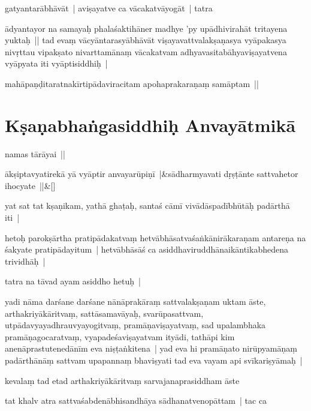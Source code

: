 \documentclass[article,a4paper]{memoir}
\begin{document}
	  \pstart gatyantarā\-bhā\-vā\-t | aviṣayatve ca vā\-cakatvā\-yogā\-t | tatra
	\pend
      

	  \pstart ā\-dyantayor na samayaḥ phalaśaktihā\-ner madhye 'py upā\-dhivirahā\-t tritayena yuktaḥ || \label{thakur75-66.19} tad evaṃ vā\-cyā\-ntarasyā\-bhā\-vā\-t viṣayavattvalakṣaṇasya vyā\-pakasya nivṛttau vipakṣato nivarttamā\-naṃ vā\-cakatvam adhyavasitabā\-hyaviṣayatvena vyā\-pyata iti vyā\-ptisiddhiḥ |
	\pend
      

	  \pstart mahā\-paṇḍitaratnakī\-rtipā\-daviracitam apohaprakaraṇaṃ samā\-ptam || 
	\pend
      
	  
	
\section[{Kṣaṇabhaṅgasiddhiḥ Anvayā\-tmikā\-}]{Kṣaṇabhaṅgasiddhiḥ Anvayā\-tmikā\-}\label{Kṣaṇabhaṅgasiddhiḥ_Anvayātmikā}

	  \pstart namas tā\-rā\-yai ||
	\pend
      
	    
	    \stanza[\smallbreak]
ā\-kṣiptavyatirekā\- yā\- vyā\-ptir anvayarū\-piṇī\- |&sā\-dharmyavati dṛṣṭā\-nte sattvahetor ihocyate ||\&[\smallbreak]


	

	  \pstart yat sat tat kṣaṇikam, yathā\- ghaṭaḥ, santaś cā\-mī\- vivā\-dā\-spadī\-bhū\-tā\-ḥ padā\-rthā\- iti |
	\pend
      

	  \pstart hetoḥ parokṣā\-rtha pratipā\-dakatvaṃ hetvā\-bhā\-satvaśaṅkā\-nirā\-karaṇam antareṇa na śakyate pratipā\-dayitum | hetvā\-bhā\-sā\-ś ca asiddhaviruddhā\-naikā\-ntikabhedena trividhā\-ḥ |
	\pend
      

	  \pstart tatra na tā\-vad ayam asiddho hetuḥ | 
	\pend
      

	  \pstart yadi nā\-ma darśane darśane nā\-nā\-prakā\-raṃ sattvalakṣaṇam uktam ā\-ste, arthakriyā\-kā\-ritvaṃ, sattā\-samavā\-yaḥ, svarū\-pasattvam, utpā\-davyayadhrauvyayogitvaṃ, pramā\-ṇaviṣayatvaṃ, sad upalambhaka pramā\-ṇagocaratvaṃ, vyapadeśaviṣayatvam ityā\-di, tathā\-pi kim anenā\-prastutenedā\-nī\-m eva niṣṭaṅkitena | yad eva hi pramā\-ṇato nirū\-pyamā\-ṇaṃ padā\-rthā\-nā\-ṃ sattvam upapannaṃ bhaviṣyati tad eva vayam api svī\-kariṣyā\-maḥ | 
	\pend
      

	  \pstart kevalaṃ tad etad arthakriyā\-kā\-ritvaṃ sarvajanaprasiddham ā\-ste
	\pend
      

	  \pstart tat khalv atra sattvaśabdenā\-bhisandhā\-ya sā\-dhanatvenopā\-ttam | tac ca
	\pend
      
\end{document}
